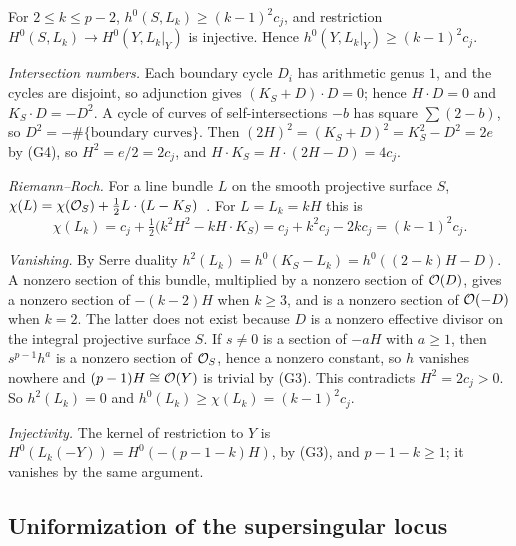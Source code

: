 \begin{lemma}\label{lem:RRk}
\notformalized
For $2\le k\le p-2$, $h^0(S,L_k)\ge(k-1)^2c_j$, and restriction $H^0(S,L_k)\to H^0(Y,L_k|_Y)$ is injective. Hence
$h^0(Y,L_k|_Y)\ge(k-1)^2c_j$.
\end{lemma}
\begin{informalproof}
\emph{Intersection numbers.} Each boundary cycle $D_i$ has arithmetic genus $1$, and the cycles are disjoint, so
adjunction gives $(K_S+D)\cdot D=0$; hence $H\cdot D=0$ and $K_S\cdot D=-D^2$. A cycle of curves of
self-intersections $-b$ has square $\sum(2-b)$, so $D^2=-\#\{\text{boundary curves}\}$. Then
$(2H)^2=(K_S+D)^2=K_S^2-D^2=2e$ by (G4), so $H^2=e/2=2c_j$, and $H\cdot K_S=H\cdot(2H-D)=4c_j$.

\emph{Riemann--Roch.} For a line bundle $L$ on the smooth projective surface $S$,
$\chi(L)=\chi(\mathcal{O}_S)+\frac12L\cdot(L-K_S)$~\cite[Section~4.1]{Liedtke2013}. For $L=L_k=kH$ this is
\[
  \chi(L_k)=c_j+\tfrac12\bigl(k^2H^2-kH\cdot K_S\bigr)=c_j+k^2c_j-2kc_j=(k-1)^2c_j.
\]

\emph{Vanishing.} By Serre duality $h^2(L_k)=h^0(K_S-L_k)=h^0((2-k)H-D)$. A nonzero section of this bundle, multiplied
by a nonzero section of $\mathcal{O}(D)$, gives a nonzero section of $-(k-2)H$ when $k\ge3$, and is a nonzero section of $\mathcal{O}(-D)$
when $k=2$. The latter does not exist because $D$ is a nonzero effective divisor on the integral projective surface $S$.
If $s\ne0$ is a section of $-aH$ with $a\ge1$, then $s^{p-1}h^a$ is a nonzero section of $\mathcal{O}_S$, hence a nonzero
constant, so $h$ vanishes nowhere and $(p-1)H\cong\mathcal{O}(Y)$ is trivial by (G3). This contradicts $H^2=2c_j>0$. So
$h^2(L_k)=0$ and $h^0(L_k)\ge\chi(L_k)=(k-1)^2c_j$.

\emph{Injectivity.} The kernel of restriction to $Y$ is $H^0(L_k(-Y))=H^0(-(p-1-k)H)$, by (G3), and $p-1-k\ge1$; it
vanishes by the same argument.
\end{informalproof}

\subsection{Uniformization of the supersingular locus}\label{sec:arith-unif}

